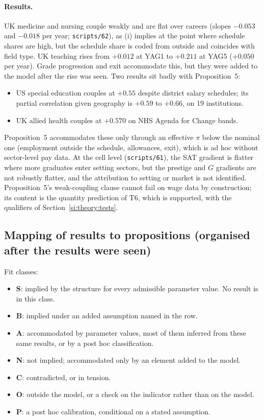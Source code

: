 \documentclass[11pt]{article}
\begin{document}
\paragraph{Results.} UK medicine and nursing couple weakly and are flat over careers (slopes $-0.053$ and $-0.018$
per year; \texttt{scripts/62}), as (i) implies at the point where schedule shares are high, but the schedule share
is coded from outside and coincides with field type. UK teaching rises from $+0.012$ at YAG1 to $+0.211$ at YAG5
($+0.050$ per year). Grade progression and exit accommodate this, but they were added to the model after the rise
was seen. Two results sit badly with Proposition~5:
\begin{itemize}
\item US special education couples at $+0.55$ despite district salary schedules; its partial correlation given
geography is $+0.59$ to $+0.66$, on 19 institutions.
\item UK allied health couples at $+0.570$ on NHS Agenda for Change bands.
\end{itemize}
Proposition~5 accommodates these only through an effective $\pi$ below the nominal one (employment outside the
schedule, allowances, exit), which is ad hoc without sector-level pay data. At the cell level
(\texttt{scripts/61}), the SAT gradient is flatter where more graduates enter setting sectors, but the prestige and
$G$ gradients are not robustly flatter, and the attribution to setting or market is not identified.
Proposition~5's weak-coupling clause cannot fail on wage data by construction; its content is the quantity
prediction of T6, which is supported, with the qualifiers of Section~\ref{si:theory:tests}.

\subsection{Mapping of results to propositions (organised after the results were seen)}\label{si:theory:map}

Fit classes:
\begin{itemize}
\item \textbf{S}: implied by the structure for every admissible parameter value. No result is in this class.
\item \textbf{B}: implied under an added assumption named in the row.
\item \textbf{A}: accommodated by parameter values, most of them inferred from these same results, or by a post hoc
classification.
\item \textbf{N}: not implied; accommodated only by an element added to the model.
\item \textbf{C}: contradicted, or in tension.
\item \textbf{O}: outside the model, or a check on the indicator rather than on the model.
\item \textbf{P}: a post hoc calibration, conditional on a stated assumption.
\end{itemize}
\end{document}

